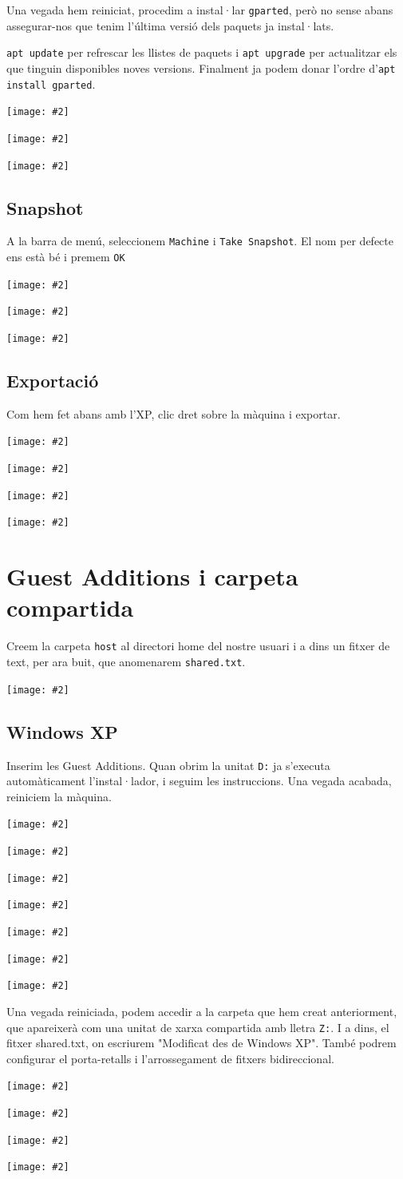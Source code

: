 \documentclass[a4paper,12pt]{article}
\newcommand{\mygraphic}[2][width=0.9\textwidth]{\begin{center}
		\centering\texttt{[image: \#2]}\par
\end{center}}
\begin{document}
\newpage
Una vegada hem reiniciat, procedim a instal·lar \texttt{gparted}, però no sense abans assegurar-nos que tenim l'última versió dels paquets ja instal·lats.

\texttt{apt update} per refrescar les llistes de paquets i \texttt{apt upgrade} per actualitzar els que tinguin disponibles noves versions. Finalment ja podem donar l'ordre d'\texttt{apt install gparted}.
\mygraphic[height=0.45\textheight]{imatges/f12.png}
\mygraphic[height=0.45\textheight]{imatges/f13.png}
\mygraphic[height=0.45\textheight]{imatges/f14.png}

\subsection{Snapshot}
A la barra de menú, seleccionem \texttt{Machine} i \texttt{Take Snapshot}. El nom per defecte ens està bé i premem \texttt{OK}
\mygraphic{imatges/f15.png}
\mygraphic{imatges/f17.png}
\mygraphic{imatges/f18.png}

\subsection{Exportació}
Com hem fet abans amb l'XP, clic dret sobre la màquina i exportar.
\mygraphic{imatges/f19.png}
\mygraphic{imatges/f20.png}
\mygraphic{imatges/f21.png}
\mygraphic{imatges/f22.png}

\newpage
\section{Guest Additions i carpeta compartida}
Creem la carpeta \texttt{host} al directori home del nostre usuari i a dins un fitxer de text, per ara buit, que anomenarem \texttt{shared.txt}.
\mygraphic{imatges/g1.png}

\subsection{Windows XP}
Inserim les Guest Additions. Quan obrim la unitat \texttt{D:} ja s'executa automàticament l'instal·lador, i seguim les instruccions. Una vegada acabada, reiniciem la màquina.
\mygraphic[height=0.45\textheight]{imatges/g2.png}
\mygraphic[height=0.45\textheight]{imatges/g3.png}
\mygraphic[height=0.45\textheight]{imatges/g4.png}
\mygraphic[height=0.45\textheight]{imatges/g5.png}
\mygraphic[height=0.45\textheight]{imatges/g6.png}
\mygraphic[height=0.45\textheight]{imatges/g7.png}
\mygraphic[height=0.45\textheight]{imatges/g8.png}
Una vegada reiniciada, podem accedir a la carpeta que hem creat anteriorment, que apareixerà com una unitat de xarxa compartida amb lletra \texttt{Z:}. I a dins, el fitxer shared.txt, on escriurem "Modificat des de Windows XP".
També podrem configurar el porta-retalls i l'arrossegament de fitxers bidireccional.
\mygraphic{imatges/g9.png}
\mygraphic[height=0.45\textheight]{imatges/g10.png}
\mygraphic[height=0.45\textheight]{imatges/g11.png}
\mygraphic[height=0.45\textheight]{imatges/g12.png}
\end{document}
